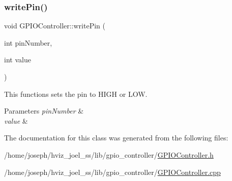\subsubsection{\texorpdfstring{write\+Pin()}{writePin()}}
{\footnotesize\ttfamily void G\+P\+I\+O\+Controller\+::write\+Pin (\begin{DoxyParamCaption}\item[{int}]{pin\+Number,  }\item[{int}]{value }\end{DoxyParamCaption})}



This functions sets the pin to H\+I\+GH or L\+OW. 


\begin{DoxyParams}{Parameters}
{\em pin\+Number} & \\
\hline
{\em value} & \\
\hline
\end{DoxyParams}


The documentation for this class was generated from the following files\+:\begin{DoxyCompactItemize}
\item 
/home/joseph/hviz\+\_\+joel\+\_\+ss/lib/gpio\+\_\+controller/\hyperlink{GPIOController_8h}{G\+P\+I\+O\+Controller.\+h}\item 
/home/joseph/hviz\+\_\+joel\+\_\+ss/lib/gpio\+\_\+controller/\hyperlink{GPIOController_8cpp}{G\+P\+I\+O\+Controller.\+cpp}\end{DoxyCompactItemize}
